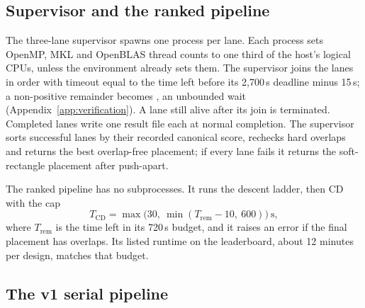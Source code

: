 \subsection{Supervisor and the ranked pipeline}\label{app:alg-supervisor}

The three-lane supervisor spawns one process per lane. Each process sets
OpenMP, MKL and OpenBLAS thread counts to one third of the host's logical CPUs,
unless the environment already sets them. The supervisor joins the lanes in order
with timeout equal to the time left before its 2,700\,s deadline minus 15\,s;
a non-positive remainder becomes , an unbounded wait
(Appendix~\ref{app:verification}). A lane still alive after its join is terminated.
Completed lanes write one result file each at normal completion. The supervisor
sorts successful lanes by their recorded canonical score, rechecks hard overlaps
and returns the best overlap-free placement; if every lane fails it returns the
soft-rectangle placement after push-apart.

The ranked pipeline has no subprocesses. It runs the descent ladder, then CD with
the cap
\begin{equation*}
 T_{\mathrm{CD}}=\max\bigl(30,\ \min(T_{\mathrm{rem}}-10,\ 600)\bigr)\ \text{s},
\end{equation*}
where $T_{\mathrm{rem}}$ is the time left in its 720\,s budget, and it raises an error
if the final placement has overlaps.
Its listed runtime on the leaderboard, about 12 minutes per design, matches that
budget.

\subsection{The v1 serial pipeline}\label{app:alg-v1}

